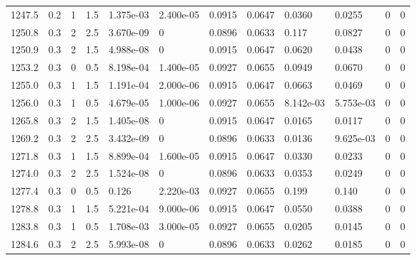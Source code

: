 \documentclass[preview]{standalone}
\begin{document}
{{{{{{{\begin{tabular}{L{1.2cm}C{1.2cm} C{0.3cm}C{0.5cm} C{1.4cm}C{1.4cm} C{1.4cm}C{1.4cm} C{1.6cm}C{1.6cm} C{1.6cm}C{1.6cm}}
  1247.5  &   0.2  & 1     & 1.5 &  1.375e-03  & 2.400e-05  &  0.0915&   0.0647& 0.0360 & 0.0255   &  0 & 0  \\ 
  1250.8  &   0.3  & 2     & 2.5 &  3.670e-09  & 0  &  0.0896&   0.0633& 0.117 & 0.0827   &  0 & 0  \\ 
  1250.9  &   0.3  & 2     & 1.5 &  4.988e-08  & 0  &  0.0915&   0.0647& 0.0620 & 0.0438   &  0 & 0  \\ 
  1253.2  &   0.3  & 0     & 0.5 &  8.198e-04  & 1.400e-05  &  0.0927&   0.0655& 0.0949 & 0.0670   &  0 & 0  \\ 
  1255.0  &   0.3  & 1     & 1.5 &  1.191e-04  & 2.000e-06  &  0.0915&   0.0647& 0.0663 & 0.0469   &  0 & 0  \\ 
  1256.0  &   0.3  & 1     & 0.5 &  4.679e-05  & 1.000e-06  &  0.0927&   0.0655& 8.142e-03 & 5.753e-03   &  0 & 0  \\ 
  1265.8  &   0.3  & 2     & 1.5 &  1.405e-08  & 0  &  0.0915&   0.0647& 0.0165 & 0.0117   &  0 & 0  \\ 
  1269.2  &   0.3  & 2     & 2.5 &  3.432e-09  & 0  &  0.0896&   0.0633& 0.0136 & 9.625e-03   &  0 & 0  \\ 
  1271.8  &   0.3  & 1     & 1.5 &  8.899e-04  & 1.600e-05  &  0.0915&   0.0647& 0.0330 & 0.0233   &  0 & 0  \\ 
  1274.0  &   0.3  & 2     & 2.5 &  1.524e-08  & 0  &  0.0896&   0.0633& 0.0353 & 0.0249   &  0 & 0  \\ 
  1277.4  &   0.3  & 0     & 0.5 &  0.126  & 2.220e-03  &  0.0927&   0.0655& 0.199 & 0.140   &  0 & 0  \\ 
  1278.8  &   0.3  & 1     & 1.5 &  5.221e-04  & 9.000e-06  &  0.0915&   0.0647& 0.0550 & 0.0388   &  0 & 0  \\ 
  1283.8  &   0.3  & 1     & 0.5 &  1.708e-03  & 3.000e-05  &  0.0927&   0.0655& 0.0205 & 0.0145   &  0 & 0  \\ 
  1284.6  &   0.3  & 2     & 2.5 &  5.993e-08  & 0  &  0.0896&   0.0633& 0.0262 & 0.0185   &  0 & 0  \\ 
\hline 
\end{tabular} 

}}}}}}}
\end{document}

